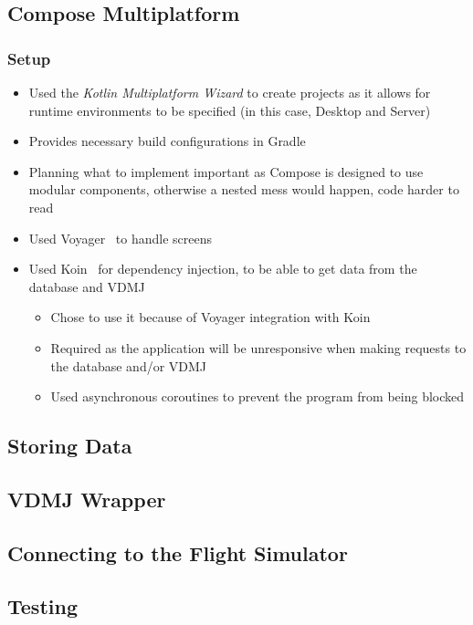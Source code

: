 \documentclass[../dissertation.tex]{subfiles}
\begin{document}
\subsection{Compose Multiplatform}
\subsubsection{Setup}
\begin{itemize}
  \item Used the \textit{Kotlin Multiplatform Wizard} to create projects as it allows
    for runtime environments to be specified (in this case, Desktop and Server)
  \item Provides necessary build configurations in Gradle
  \item Planning what to implement important as Compose is designed to use modular
    components, otherwise a nested mess would happen, code harder to read
  \item Used Voyager~\cite{voyager} to handle screens
  \item Used Koin~\cite{koin} for dependency injection, to be able to get data from the
    database and VDMJ
    \begin{itemize}
      \item Chose to use it because of Voyager integration with Koin~\cite{voyager:koin}
      \item Required as the application will be unresponsive when making requests
        to the database and/or VDMJ
      \item Used asynchronous coroutines to prevent the program from being blocked
    \end{itemize}
\end{itemize}

\subsection{Storing Data}


\subsection{VDMJ Wrapper}


\subsection{Connecting to the Flight Simulator}


\subsection{Testing}
\end{document}
